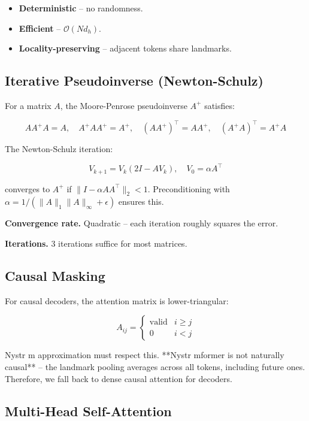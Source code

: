 \begin{itemize}
\item \textbf{Deterministic} -- no randomness.
\item \textbf{Efficient} -- $\mathcal{O}(N d_h)$.
\item \textbf{Locality-preserving} -- adjacent tokens share landmarks.

\end{itemize}
\subsection{Iterative Pseudoinverse (Newton-Schulz)}

For a matrix $A$, the Moore-Penrose pseudoinverse $A^+$ satisfies:

\[
A A^+ A = A, \quad A^+ A A^+ = A^+, \quad (A A^+)^\top = A A^+, \quad (A^+ A)^\top = A^+ A
\tag{3.6}
\]

The Newton-Schulz iteration:

\[
V_{k+1} = V_k (2 I - A V_k), \quad V_0 = \alpha A^\top
\tag{3.7}
\]

converges to $A^+$ if $\|I - \alpha A A^\top\|_2 < 1$. Preconditioning 
with $\alpha = 1 / (\|A\|_1 \|A\|_\infty + \epsilon)$ ensures this.

\textbf{Convergence rate.} Quadratic -- each iteration roughly squares the error.

\textbf{Iterations.} 3 iterations suffice for most matrices.

\subsection{Causal Masking}

For causal decoders, the attention matrix is lower-triangular:

\[
A_{ij} = \begin{cases} \text{valid} & i \geq j \\ 0 & i < j \end{cases}
\tag{3.8}
\]

Nystr m approximation must respect this. **Nystr mformer is not naturally 
causal** -- the landmark pooling averages across all tokens, including 
future ones. Therefore, we fall back to dense causal attention for decoders.

\subsection{Multi-Head Self-Attention}

